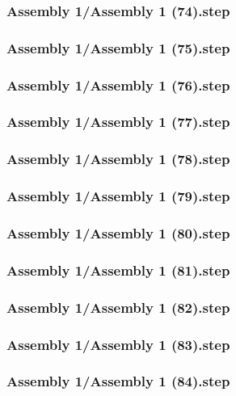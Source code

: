 \documentclass[a4paper,12pt]{article}
\begin{document}
\subsubsection{Assembly 1/Assembly 1 (74).step}

\subsubsection{Assembly 1/Assembly 1 (75).step}

\subsubsection{Assembly 1/Assembly 1 (76).step}

\subsubsection{Assembly 1/Assembly 1 (77).step}

\subsubsection{Assembly 1/Assembly 1 (78).step}

\subsubsection{Assembly 1/Assembly 1 (79).step}

\subsubsection{Assembly 1/Assembly 1 (80).step}

\subsubsection{Assembly 1/Assembly 1 (81).step}

\subsubsection{Assembly 1/Assembly 1 (82).step}

\subsubsection{Assembly 1/Assembly 1 (83).step}

\subsubsection{Assembly 1/Assembly 1 (84).step}

\end{document}
